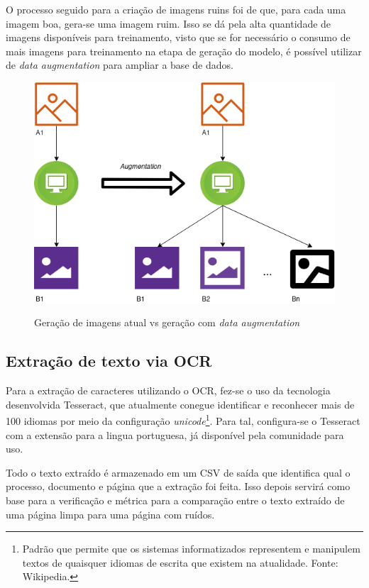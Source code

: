 O processo seguido para a criação de imagens ruins foi de que, para cada uma imagem boa, gera-se uma imagem ruim. Isso se dá pela alta quantidade de imagens disponíveis para treinamento, visto que se for necessário o consumo de mais imagens para treinamento na etapa de geração do modelo, é possível utilizar de \textit{data augmentation} para ampliar a base de dados.

\begin{figure}[H]
  \centering
  \caption{Geração de imagens atual vs geração com \textit{data augmentation}}
  \includegraphics[scale=.6]{figuras/data-augmentation.png}
  \label{fig:data-augmentation}
\end{figure}

\subsection{Extração de texto via OCR}

Para a extração de caracteres utilizando o OCR, fez-se o uso da tecnologia desenvolvida Tesseract, que atualmente conegue identificar e reconhecer mais de 100 idiomas por meio da configuração \textit{unicode}\footnote{
  Padrão que permite que os sistemas informatizados representem e manipulem textos de quaisquer idiomas de escrita que existem na atualidade. Fonte: Wikipedia.
}. Para tal, configura-se o Tesseract com a extensão para a lingua portuguesa, já disponível pela comunidade para uso.

Todo o texto extraído é armazenado em um CSV de saída que identifica qual o processo, documento e página que a extração foi feita. Isso depois servirá como base para a verificação e métrica para a comparação entre o texto extraído de uma página limpa para uma página com ruídos.